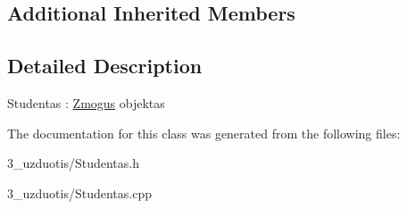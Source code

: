 \subsection*{Additional Inherited Members}


\subsection{Detailed Description}
Studentas \+: \mbox{\hyperlink{class_zmogus}{Zmogus}} objektas 

The documentation for this class was generated from the following files\+:\begin{DoxyCompactItemize}
\item 
3\+\_\+uzduotis/Studentas.\+h\item 
3\+\_\+uzduotis/Studentas.\+cpp\end{DoxyCompactItemize}
